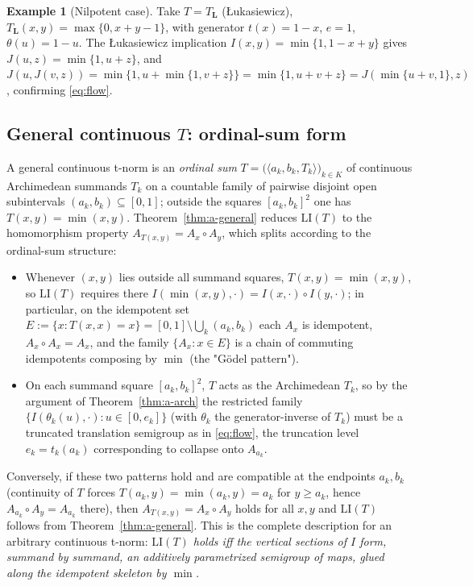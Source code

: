\documentclass{amsart}
\theoremstyle{definition}
\newtheorem{example}{Example}
\theoremstyle{remark}
\newcommand{\zo}{[0,1]}
\newcommand{\LI}{\mathrm{LI}}
\newcommand{\Ax}{A}
\begin{document}
\begin{example}[Nilpotent case]\label{ex:nilp}
Take $T=T_{\mathbf L}$ (\L ukasiewicz), $T_{\mathbf L}(x,y)=\max\{0,x+y-1\}$, with
generator $t(x)=1-x$, $e=1$, $\theta(u)=1-u$. The \L ukasiewicz implication
$I(x,y)=\min\{1,1-x+y\}$ gives $J(u,z)=\min\{1,u+z\}$, and
$J(u,J(v,z))=\min\{1,u+\min\{1,v+z\}\}=\min\{1,u+v+z\}=J(\min\{u+v,1\},z)$,
confirming \eqref{eq:flow}.
\end{example}

\subsection{General continuous $T$: ordinal-sum form}

A general continuous t-norm is an \emph{ordinal sum}
$T=\bigl(\langle a_k,b_k,T_k\rangle\bigr)_{k\in K}$ of continuous Archimedean summands
$T_k$ on a countable family of pairwise disjoint open subintervals
$(a_k,b_k)\subseteq\zo$; outside the squares $[a_k,b_k]^2$ one has $T(x,y)=\min(x,y)$.
Theorem~\ref{thm:a-general} reduces $\LI(T)$ to the homomorphism property
$\Ax_{T(x,y)}=\Ax_x\circ\Ax_y$, which splits according to the ordinal-sum structure:
\begin{itemize}
\item Whenever $(x,y)$ lies outside all summand squares, $T(x,y)=\min(x,y)$, so $\LI(T)$
requires there $I(\min(x,y),\cdot)=I(x,\cdot)\circ I(y,\cdot)$; in particular, on the
idempotent set $E:=\{x:T(x,x)=x\}=\zo\setminus\bigcup_k(a_k,b_k)$ each $\Ax_x$ is
idempotent, $\Ax_x\circ\Ax_x=\Ax_x$, and the family $\{\Ax_x:x\in E\}$ is a chain of
commuting idempotents composing by $\min$ (the "G\"odel pattern").
\item On each summand square $[a_k,b_k]^2$, $T$ acts as the Archimedean $T_k$, so by the
argument of Theorem~\ref{thm:a-arch} the restricted family
$\{I(\theta_k(u),\cdot):u\in[0,e_k]\}$ (with $\theta_k$ the generator-inverse of $T_k$)
must be a truncated translation semigroup as in \eqref{eq:flow}, the truncation level
$e_k=t_k(a_k)$ corresponding to collapse onto $\Ax_{a_k}$.
\end{itemize}
Conversely, if these two patterns hold and are compatible at the endpoints $a_k,b_k$
(continuity of $T$ forces $T(a_k,y)=\min(a_k,y)=a_k$ for $y\ge a_k$, hence
$\Ax_{a_k}\circ\Ax_y=\Ax_{a_k}$ there), then $\Ax_{T(x,y)}=\Ax_x\circ\Ax_y$ holds for all
$x,y$ and $\LI(T)$ follows from Theorem~\ref{thm:a-general}. This is the complete
description for an arbitrary continuous t-norm: \emph{$\LI(T)$ holds iff the vertical
sections of $I$ form, summand by summand, an additively parametrized semigroup of maps,
glued along the idempotent skeleton by $\min$.}
\end{document}
